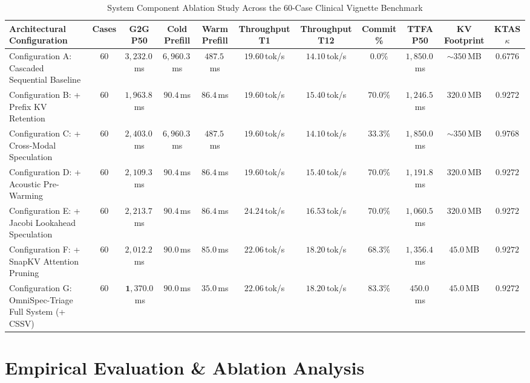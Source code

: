 \documentclass[10pt,journal,compsoc]{IEEEtran}
\begin{document}
\begin{table}[!t]
\centering
\caption{System Component Ablation Study Across the 60-Case Clinical Vignette Benchmark}
\label{tab:ablation_matrix}
\footnotesize
\setlength{\tabcolsep}{4.5pt}
\begin{tabular*}{\textwidth}{@{\extracolsep{\fill}}lcccccccccc@{}}
\toprule
\textbf{Architectural Configuration} & \textbf{Cases} & \textbf{G2G P50} & \textbf{Cold Prefill} & \textbf{Warm Prefill} & \textbf{Throughput T1} & \textbf{Throughput T12} & \textbf{Commit \%} & \textbf{TTFA P50} & \textbf{KV Footprint} & \textbf{KTAS $\kappa$} \\
\midrule
Configuration A: Cascaded Sequential Baseline & 60 & $3{,}232.0$\,ms & $6{,}960.3$\,ms & $487.5$\,ms & $19.60$\,tok/s & $14.10$\,tok/s & $0.0\%$ & $1{,}850.0$\,ms & $\sim 350$\,MB & $0.6776$ \\
Configuration B: + Prefix KV Retention & 60 & $1{,}963.8$\,ms & $\mathbf{90.4}$\,ms & $\mathbf{86.4}$\,ms & $19.60$\,tok/s & $15.40$\,tok/s & $70.0\%$ & $1{,}246.5$\,ms & $320.0$\,MB & $0.9272$ \\
Configuration C: + Cross-Modal Speculation & 60 & $2{,}403.0$\,ms & $6{,}960.3$\,ms & $487.5$\,ms & $19.60$\,tok/s & $14.10$\,tok/s & $33.3\%$ & $1{,}850.0$\,ms & $\sim 350$\,MB & $\mathbf{0.9768}$ \\
Configuration D: + Acoustic Pre-Warming & 60 & $2{,}109.3$\,ms & $90.4$\,ms & $86.4$\,ms & $19.60$\,tok/s & $15.40$\,tok/s & $70.0\%$ & $1{,}191.8$\,ms & $320.0$\,MB & $0.9272$ \\
Configuration E: + Jacobi Lookahead Speculation & 60 & $2{,}213.7$\,ms & $90.4$\,ms & $86.4$\,ms & $\mathbf{24.24}$\,tok/s & $16.53$\,tok/s & $70.0\%$ & $1{,}060.5$\,ms & $320.0$\,MB & $0.9272$ \\
Configuration F: + SnapKV Attention Pruning & 60 & $2{,}012.2$\,ms & $90.0$\,ms & $85.0$\,ms & $22.06$\,tok/s & $\mathbf{18.20}$\,tok/s & $68.3\%$ & $1{,}356.4$\,ms & $\mathbf{45.0}$\,MB & $0.9272$ \\
Configuration G: OmniSpec-Triage Full System (+ CSSV) & 60 & $\mathbf{1{,}370.0}$\,ms & $\mathbf{90.0}$\,ms & $\mathbf{35.0}$\,ms & $22.06$\,tok/s & $\mathbf{18.20}$\,tok/s & $\mathbf{83.3\%}$ & $\mathbf{450.0}$\,ms & $\mathbf{45.0}$\,MB & $0.9272$ \\
\bottomrule
\end{tabular*}
\end{table}

\section{Empirical Evaluation \& Ablation Analysis}
\label{sec:results}
\end{document}

